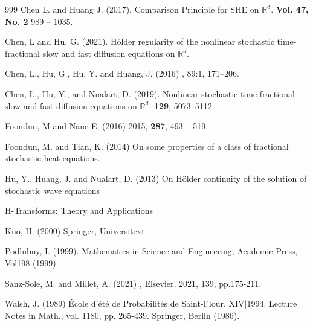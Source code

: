 \documentclass[a4paper,11pt]{article}
\numberwithin{equation}{section}
\theoremstyle{plain}
\theoremstyle{definition}
\newcommand{\R}{\mathbb{R}}
\numberwithin{NQ}{section}
\numberwithin{LQ}{section}
\numberwithin{ZQ}{section}
\begin{document}
	\begin{thebibliography}{999}
		Chen L. and Huang J. (2017).
		\newblock Comparison Principle for SHE on $\R^d$.
		 \textbf{Vol. 47, No. 2} 989 -- 1035.
		
		Chen, L and Hu, G. (2021).
		\newblock H\"older regularity of the nonlinear stochastic time-fractional slow and fast diffusion equations on $\R^d$.
		
		Chen, L., Hu, G., Hu, Y. and Huang, J. (2016)
		, 89:1, 171--206.
		
		Chen, L., Hu, Y., and Nualart, D. (2019).
		\newblock Nonlinear stochastic time-fractional slow and fast diffusion equations on $\R^d$.
		 \textbf{129}, 5073--5112
		
		Foondun, M and Nane E. (2016)
		 2015, \textbf{287}, 493 -- 519
		
		Foondun, M. and Tian, K. (2014)
		\newblock On some properties of a class of fractional stochastic heat equations.
		
		Hu, Y., Huang, J. and Nualart, D. (2013)
		\newblock On H\"older continuity of the solution of stochastic wave
		equations
		
		\newblock H-Transforms: Theory and Applications 
		
		Kuo, H. (2000)
		\newblock Springer, Universitext
		
		Podlubny, I. (1999).
		\newblock Mathematics in Science and Engineering, Academic Press, Vol198 (1999).
		
		Sanz-Sole, M. and Millet, A. (2021)
		, Elsevier, 2021, 139, pp.175-211.
		
		Walsh, J. (1989)
		\newblock \'Ecole d'\'et\'e de Probabilit\'es de Saint-Flour, XIV|1994. Lecture Notes in Math., vol. 1180, pp. 265-439. Springer, Berlin (1986).
	\end{thebibliography}
	
\end{document}

